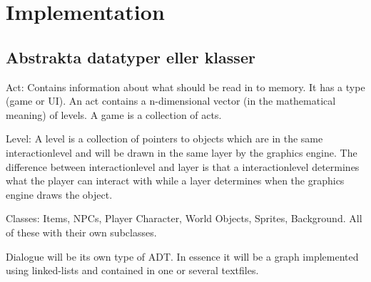 \documentclass[12pt,a4paper]{article}
\begin{document}
\bigskip

\section{Implementation}

\subsection{Abstrakta datatyper eller klasser}

Act: Contains information about what should be read in to memory. It has a type (game or UI). An act contains a n-dimensional vector (in the mathematical meaning) of levels. A game is a collection of acts.


Level: A level is a collection of pointers to objects which are in the same interactionlevel and will be drawn in the same layer by the graphics engine. The difference between interactionlevel and layer is that a interactionlevel determines what the player can interact with while a layer determines when the graphics engine draws the object.


Classes: Items, NPCs, Player Character, World Objects, Sprites, Background. All of these with their own subclasses.

Dialogue will be its own type of ADT. In essence it will be a graph implemented using linked-lists and contained in one or several textfiles. 
\end{document}
